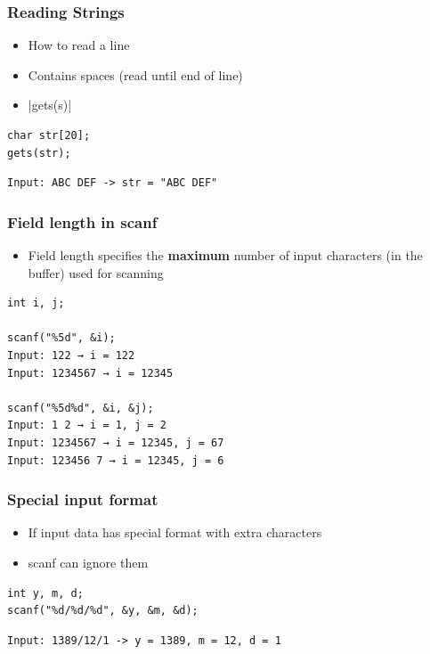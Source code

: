 \documentclass{../c-lecture}
\begin{document}
\begin{frame}[fragile]
  \frametitle{Reading Strings}
  \begin{itemize}
    \item How to read a line
    \item Contains spaces (read until end of line)
    \item {}|gets(s)|
  \end{itemize}
  \begin{verbatim}
char str[20];
gets(str);
  \end{verbatim}
  \begin{verbatim}
Input: ABC DEF -> str = "ABC DEF"
  \end{verbatim}
\end{frame}

\begin{frame}[fragile]
  \frametitle{Field length in scanf}
  \begin{itemize}
    \item
      Field length specifies the \textbf{\color{Orange} maximum} number
      of input characters (in the buffer) used for scanning

  \end{itemize}
  \begin{verbatim}
int i, j;

scanf("%5d", &i);
Input: 122 → i = 122
Input: 1234567 → i = 12345

scanf("%5d%d", &i, &j);
Input: 1 2 → i = 1, j = 2
Input: 1234567 → i = 12345, j = 67
Input: 123456 7 → i = 12345, j = 6
  \end{verbatim}
\end{frame}

\begin{frame}[fragile]
  \frametitle{Special input format}
  \begin{itemize}
    \item If input data has special format with extra characters
    \item scanf can ignore them
  \end{itemize}
  \begin{verbatim}
int y, m, d;
scanf("%d/%d/%d", &y, &m, &d);
  \end{verbatim}
  \begin{verbatim}
Input: 1389/12/1 -> y = 1389, m = 12, d = 1
  \end{verbatim}
\end{frame}
\end{document}

